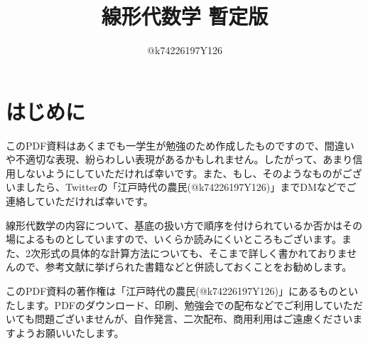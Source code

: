 \documentclass[10pt,a4paper,titlepage]{jsarticle}
\title{線形代数学 暫定版}
\author{@k74226197Y126}
\begin{document}
\maketitle
{}
\section*{はじめに}
このPDF資料はあくまでも一学生が勉強のため作成したものですので、間違いや不適切な表現、紛らわしい表現があるかもしれません。したがって、あまり信用しないようにしていただければ幸いです。また、もし、そのようなものがございましたら、Twitterの「江戸時代の農民(@k74226197Y126)」までDMなどでご連絡していただければ幸いです。\par
線形代数学の内容について、基底の扱い方で順序を付けられているか否かはその場によるものとしていますので、いくらか読みにくいところもございます。また、2次形式の具体的な計算方法についても、そこまで詳しく書かれておりませんので、参考文献に挙げられた書籍などと併読しておくことをお勧めします。\par
このPDF資料の著作権は「江戸時代の農民(@k74226197Y126)」にあるものといたします。PDFのダウンロード、印刷、勉強会での配布などでご利用していただいても問題ございませんが、自作発言、二次配布、商用利用はご遠慮くださいますようお願いいたします。
\tableofcontents
\clearpage
{}


\clearpage

\clearpage

\clearpage

\clearpage

\clearpage

\clearpage

\clearpage

\clearpage

\clearpage

\clearpage

\clearpage


\clearpage

\clearpage

\clearpage

\clearpage

\clearpage

\clearpage

\clearpage

\clearpage


\clearpage

\clearpage

\clearpage

\clearpage

\clearpage

\clearpage

\clearpage

\clearpage

\clearpage

\clearpage

\clearpage


\clearpage

\clearpage

\clearpage

\clearpage

\clearpage

\clearpage

\clearpage

\clearpage

%
\end{document}
